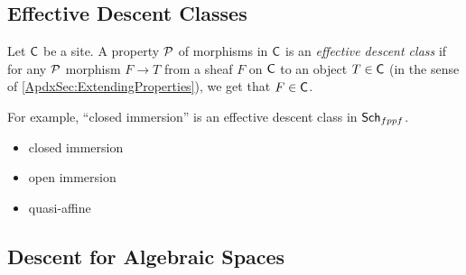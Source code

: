 % 
% 
% 



\subsection{Effective Descent Classes}

Let $\C$ be a site.  A property $\P$ of morphisms in $\C$ is an \emph{effective descent class} if for any $\P$ morphism $F\to T$ from a sheaf $F$ on $\C$ to an object $T\in \C$ (in the sense of \ref{ApdxSec:ExtendingProperties}), we get that $F\in \C$.


For example, ``closed immersion'' is an effective descent class in $\sch_{fppf}$.

\begin{itemize}
 \item closed immersion
 \item open immersion
 \item quasi-affine
\end{itemize}


\subsection{Descent for Algebraic Spaces}


